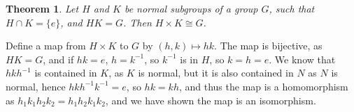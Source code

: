 \documentclass[12pt]{amsbook}
\makeatletter
\theoremstyle{plain}
\newtheorem{theorem}{Theorem}[chapter]
\theoremstyle{definition}
\renewenvironment{proof}[1][\proofname]{\par
  \pushQED{\qed}%
  \normalfont \topsep6\p@\@plus6\p@\relax
  \list{}{\leftmargin=0em
          \rightmargin=\leftmargin
          \settowidth{\itemindent}{\itshape#1}%
          \labelwidth=\itemindent}

  \item[\hskip\labelsep
        \itshape
    #1\@addpunct{.}]\ignorespaces
}{%
  \popQED\endlist\@endpefalse
}
\makeatother
\begin{document}
\begin{theorem}
Let $H$ and $K$ be normal subgroups of a group $G$, such that $H \cap K = \{ e \}$, and $HK = G$. Then $H \times K \cong G$.
\end{theorem}
\begin{proof}
    Define a map from $H \times K$ to $G$ by $(h,k) \mapsto hk$. The map is bijective, as $HK = G$, and if $hk = e$, $h = k^{-1}$, so $k^{-1}$ is in $H$, so $k = h = e$. We know that $hkh^{-1}$ is contained in $K$, as $K$ is normal, but it is also contained in $N$ as $N$ is normal, hence $hkh^{-1}k^{-1} = e$, so $hk = kh$, and thus the map is a homomorphism as $h_1k_1h_2k_2 = h_1h_2k_1k_2$, and we have shown the map is an isomorphism.
\end{proof}










\printindex
\end{document}
